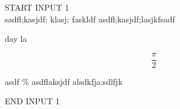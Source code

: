 
START INPUT 1 \\

sadfl;kasjdf; klasj; faskldf
asdfl;kasjdf;lasjkfsadf

day la

\begin{equation}
\frac\pi2 %
\end{equation}



asdf \% asdflaksjdf alsdkfja;sdlfjk

END INPUT 1\\